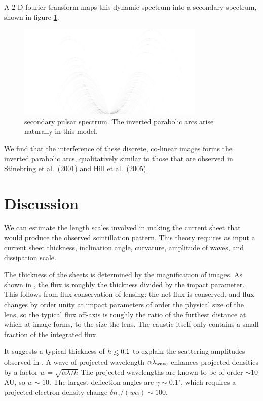 \documentclass[useAMS,usenatbib]{mn2e}
\def\lesssim{\mathrel{\hbox{\rlap{\hbox{\lower4pt\hbox{$\sim$}}}\hbox{$<$}}}}
\begin{document}
A 2-D fourier transform maps this dynamic spectrum into a secondary
spectrum, shown in figure \ref{fig:ss}.

\begin{figure}
\centerline{\includegraphics[width=3.5in]{sspectr.jpg}}
\caption{secondary pulsar spectrum.  The inverted parabolic arcs arise
naturally in this model.}
\label{fig:ss}
\end{figure}

We find that the interference of these discrete, co-linear images
forms the inverted parabolic arcs, qualitatively similar to those that are observed in
Stinebring et al.~(2001) and Hill et al.~(2005).



\section{Discussion}

We can estimate the length scales involved in making the current sheet that
would produce the observed scintillation pattern.  This theory requires as
input a current sheet thickness, inclination angle, curvature,
amplitude of waves, and dissipation scale.

The thickness of the sheets is determined by the magnification of
images.  As shown in \cite{2012MNRAS.421L.132P}, the flux is roughly
the thickness divided by the impact parameter.  This follows from flux
conservation of lensing: the net flux is conserved, and flux changes
by order unity at impact parameters of order the physical size of the
lens, so the typical flux off-axis is roughly the ratio of the
furthest distance at which at image forms, to the size the lens.  The
caustic itself only contains a small fraction of the integrated flux.



It suggests a typical thickness of $h\lesssim 0.1$ to explain the
scattering amplitudes observed in \cite{2010ApJ...708..232B}.
A wave
of projected wavelength $\alpha \lambda_{\rm wave}$ enhances projected densities
by a factor $w=\sqrt{\alpha\lambda/h}$  The projected wavelengths
are known to be of order $\sim 10$ AU, so $w \sim 10$.  The largest
deflection angles are $\gamma \sim 0.1$", which requires a
projected electron density change $\delta n_e/(w\alpha) \sim 100$.  
\end{document}

